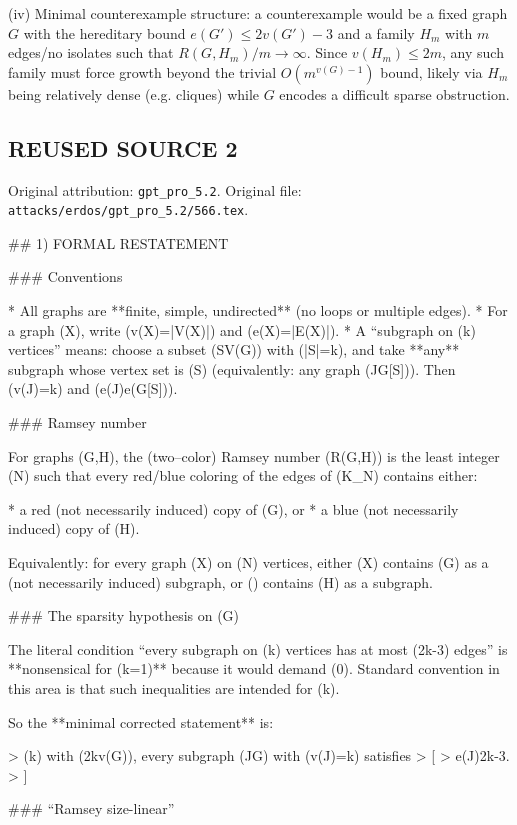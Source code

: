 (iv) Minimal counterexample structure: a counterexample would be a fixed graph $G$ with the hereditary bound $e(G')\le 2v(G')-3$ and a family $H_m$ with $m$ edges/no isolates such that $R(G,H_m)/m\to\infty$.
Since $v(H_m)\le 2m$, any such family must force growth beyond the trivial $O(m^{v(G)-1})$ bound, likely via $H_m$ being relatively dense (e.g. cliques) while $G$ encodes a difficult sparse obstruction.




\subsection*{REUSED SOURCE 2}
Original attribution: \texttt{gpt\_pro\_5.2}.
Original file: \texttt{attacks/erdos/gpt\_pro\_5.2/566.tex}.

## 1) FORMAL RESTATEMENT

### Conventions

* All graphs are **finite, simple, undirected** (no loops or multiple edges).
* For a graph (X), write (v(X)=|V(X)|) and (e(X)=|E(X)|).
* A “subgraph on (k) vertices” means: choose a subset (S\subseteq V(G)) with (|S|=k), and take **any** subgraph whose vertex set is (S) (equivalently: any graph (J\subseteq G[S])). Then (v(J)=k) and (e(J)\le e(G[S])).

### Ramsey number

For graphs (G,H), the (two–color) Ramsey number (R(G,H)) is the least integer (N) such that every red/blue coloring of the edges of (K_N) contains either:

* a red (not necessarily induced) copy of (G), or
* a blue (not necessarily induced) copy of (H).

Equivalently: for every graph (X) on (N) vertices, either (X) contains (G) as a (not necessarily induced) subgraph, or () contains (H) as a subgraph.

### The sparsity hypothesis on (G)

The literal condition “every subgraph on (k) vertices has at most (2k-3) edges” is **nonsensical for (k=1)** because it would demand (0). Standard convention in this area is that such inequalities are intended for (k).

So the **minimal corrected statement** is:

> (\forall k\in{}) with (2\le k\le v(G)), every subgraph (J\subseteq G) with (v(J)=k) satisfies
> [
> e(J)\le 2k-3.
> ]

### “Ramsey size-linear”

